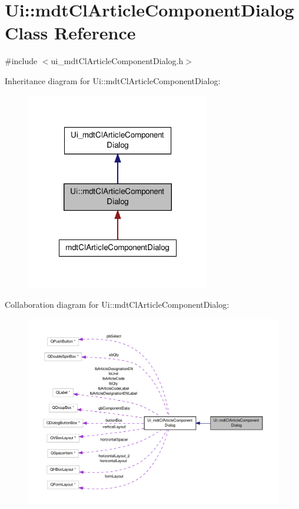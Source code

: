 \hypertarget{class_ui_1_1mdt_cl_article_component_dialog}{\section{Ui\-:\-:mdt\-Cl\-Article\-Component\-Dialog Class Reference}
\label{class_ui_1_1mdt_cl_article_component_dialog}
}


{\ttfamily \#include $<$ui\-\_\-mdt\-Cl\-Article\-Component\-Dialog.\-h$>$}



Inheritance diagram for Ui\-:\-:mdt\-Cl\-Article\-Component\-Dialog\-:
\nopagebreak
\begin{figure}[H]
\begin{center}
\leavevmode
\includegraphics[width=228pt]{class_ui_1_1mdt_cl_article_component_dialog__inherit__graph}
\end{center}
\end{figure}


Collaboration diagram for Ui\-:\-:mdt\-Cl\-Article\-Component\-Dialog\-:
\nopagebreak
\begin{figure}[H]
\begin{center}
\leavevmode
\includegraphics[width=350pt]{class_ui_1_1mdt_cl_article_component_dialog__coll__graph}
\end{center}
\end{figure}
